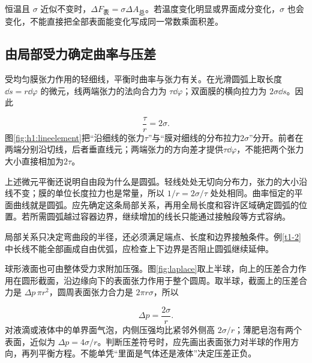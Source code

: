 恒温且 $\sigma$ 近似不变时，$\Delta F_{\text{表}}=\sigma\Delta A_{\text{总}}$。若温度变化明显或界面成分变化，$\sigma$ 也会变化，不能直接把全部表面能变化写成同一常数乘面积差。

\subsection{由局部受力确定曲率与压差}
受均匀膜张力作用的轻细线，平衡时曲率与张力有关。在光滑圆弧上取长度 $\dd s=r\dd\varphi$ 的微元，线两端张力的法向合力为 $\tau\dd\varphi$；双面膜的横向拉力为 $2\sigma\dd s$。因此

\[\frac\tau r=2\sigma.\]
图\ref{fig:h1:lineelement}把“沿细线的张力$\tau$”与“膜对细线的分布拉力$2\sigma$”分开。前者在两端分别沿切线，后者垂直线元；两端张力的方向差才提供$\tau\dd\varphi$，不能把两个张力大小直接相加为$2\tau$。



上述微元平衡还说明自由段为什么是圆弧。轻线处处无切向分布力，张力的大小沿线不变；膜的单位长度拉力也是常量，所以 $1/r=2\sigma/\tau$ 处处相同。曲率恒定的平面曲线就是圆弧。应先确定这条局部关系，再用全局长度和容许区域确定圆弧的位置。若所需圆弧越过容器边界，继续增加的线长只能通过接触段等方式容纳。

局部关系只决定弯曲段的半径，还必须满足端点、长度和边界接触条件。例\ref{t1-2}中长线不能全部画成自由优弧，应检查上下边界是否阻止圆弧继续延伸。

球形液面也可由整体受力求附加压强。图\ref{fig:laplace}取上半球，向上的压差合力作用在圆形截面，沿边缘向下的表面张力作用于整个圆周。取半球，截面上的压差合力是 $\Delta p\,\pi r^2$，圆周表面张力合力是 $2\pi r\sigma$，所以

\[\boxed{\Delta p=\frac{2\sigma}{r}}.\]
对液滴或液体中的单界面气泡，内侧压强均比紧邻外侧高 $2\sigma/r$；薄肥皂泡有两个表面，近似为 $\Delta p=4\sigma/r$。判断压差符号时，应先画出表面张力对半球的作用方向，再列平衡方程。不能单凭“里面是气体还是液体”决定压差正负。

